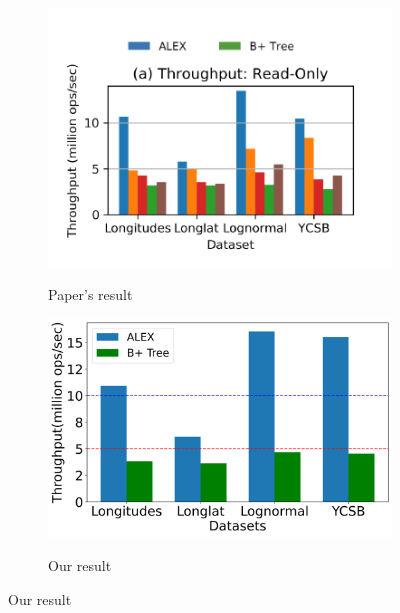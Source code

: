 \documentclass[12pt,a4paper]{article}
\begin{document}
\begin{figure}[htbp]
    

    \begin{subfigure}{0.3\textwidth}
        \includegraphics[width=\linewidth]{Figures/readonlu.png}
        \label{paper's result readonly}
        \caption{Paper's result}
    \end{subfigure}
    \begin{subfigure}{0.3\textwidth}
        \includegraphics[width=\linewidth]{Figures/Readonly.png }
        \label{our result readonly}
        \caption{Our result}
        

\end{subfigure}
\end{figure}
\end{document}
